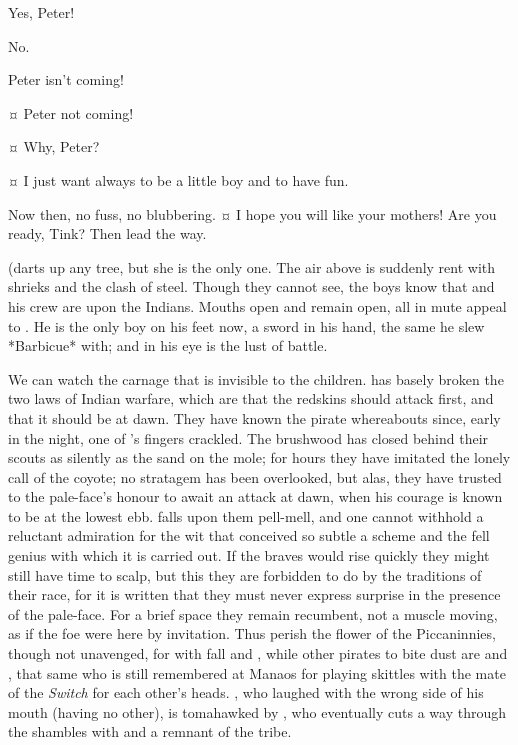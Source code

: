 \begin{drama}
\wendyspeaks
Yes, Peter!

\peterspeaks
No.


\wendyspeaks
Peter isn't coming!


\johnspeaks {}¤
Peter not coming!

\tootlesspeaks {}¤
Why, Peter?

\peterspeaks {}¤
I just want always to be a little boy and to have fun.


\speakercontinues
Now then, no fuss, no blubbering.
¤
I hope you will like your mothers!
Are you ready, Tink?
Then lead the way.

\begin{stagedir}
(\tink darts up any tree, but she is the only one.
The air above is suddenly rent with shrieks and the clash of steel.
Though they cannot see, the boys know that \hook and his crew are upon the Indians.
Mouths open and remain open, all in mute appeal to \peter.
He is the only boy on his feet now, a sword in his hand, the same he slew *Barbicue* with;
and in his eye is the lust of battle.

We can watch the carnage that is invisible to the children.
\hook has basely broken the two laws of Indian warfare,
which are that the redskins should attack first, and that it should be at dawn.
They have known the pirate whereabouts since, early in the night, one of \smee's fingers crackled.
The brushwood has closed behind their scouts as silently as the sand on the mole;
for hours they have imitated the lonely call of the coyote;
no stratagem has been overlooked, but alas, they have trusted to the pale-face's honour to await an attack at dawn,
when his courage is known to be at the lowest ebb.
\hook falls upon them pell-mell,
and one cannot withhold a reluctant admiration for the wit that conceived so subtle a scheme
and the fell genius with which it is carried out.
If the braves would rise quickly they might still have time to scalp,
but this they are forbidden to do by the traditions of their race,
for it is written that they must never express surprise in the presence of the pale-face.
For a brief space they remain recumbent, not a muscle moving, as if the foe were here by invitation.
Thus perish the flower of the Piccaninnies, though not unavenged,
for with  fall  and ,
while other pirates to bite dust are  and ,
that same  who is still remembered at Manaos
for playing skittles with the mate of the \emph{Switch} for each other's heads.
, who laughed with the wrong side of his mouth (having no other),
is tomahawked by \panther,
who eventually cuts a way through the shambles with \tigerlily and a remnant of the tribe.


\end{stagedir}
\end{drama}
